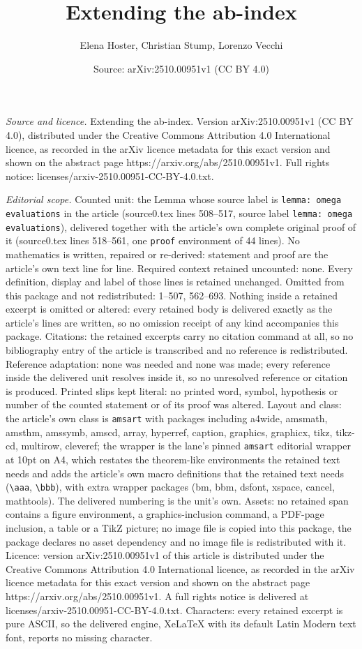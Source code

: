 \documentclass[10pt,a4paper]{amsart}
\title[Extending the ab-index]{Extending the ab-index}
\author{Elena Hoster, Christian Stump, Lorenzo Vecchi}
\date{Source: arXiv:2510.00951v1 (CC BY 4.0)}
\begin{document}
\maketitle

\noindent\emph{Source and licence.} Extending the ab-index. Version arXiv:2510.00951v1 (CC BY 4.0), distributed under the Creative Commons Attribution 4.0 International licence, as recorded in the arXiv licence metadata for this exact version and shown on the abstract page https://arxiv.org/abs/2510.00951v1. Full rights notice: licenses/arxiv-2510.00951-CC-BY-4.0.txt.\par\smallskip

\noindent\textit{Editorial scope.} Counted unit: the Lemma whose source label is \texttt{lemma: omega evaluations} in the article (source0.tex lines 508--517, source label \texttt{lemma: omega evaluations}), delivered together with the article's own complete original proof of it (source0.tex lines 518--561, one \texttt{proof} environment of 44 lines). No mathematics is written, repaired or re-derived: statement and proof are the article's own text line for line. Required context retained uncounted: none. Every definition, display and label of those lines is retained unchanged. Omitted from this package and not redistributed: 1--507, 562--693. Nothing inside a retained excerpt is omitted or altered: every retained body is delivered exactly as the article's lines are written, so no omission receipt of any kind accompanies this package. Citations: the retained excerpts carry no citation command at all, so no bibliography entry of the article is transcribed and no reference is redistributed. Reference adaptation: none was needed and none was made; every reference inside the delivered unit resolves inside it, so no unresolved reference or citation is produced. Printed slips kept literal: no printed word, symbol, hypothesis or number of the counted statement or of its proof was altered. Layout and class: the article's own class is \texttt{amsart} with packages including a4wide, amsmath, amsthm, amssymb, amscd, array, hyperref, caption, graphics, graphicx, tikz, tikz-cd, multirow, cleveref; the wrapper is the lane's pinned \texttt{amsart} editorial wrapper at 10pt on A4, which restates the theorem-like environments the retained text needs and adds the article's own macro definitions that the retained text needs (\texttt{\textbackslash aaa}, \texttt{\textbackslash bbb}), with extra wrapper packages (bm, bbm, dsfont, xspace, cancel, mathtools). The delivered numbering is the unit's own. Assets: no retained span contains a figure environment, a graphics-inclusion command, a PDF-page inclusion, a table or a TikZ picture; no image file is copied into this package, the package declares no asset dependency and no image file is redistributed with it. Licence: version arXiv:2510.00951v1 of this article is distributed under the Creative Commons Attribution 4.0 International licence, as recorded in the arXiv licence metadata for this exact version and shown on the abstract page https://arxiv.org/abs/2510.00951v1. A full rights notice is delivered at licenses/arxiv-2510.00951-CC-BY-4.0.txt. Characters: every retained excerpt is pure ASCII, so the delivered engine, XeLaTeX with its default Latin Modern text font, reports no missing character.
\end{document}
